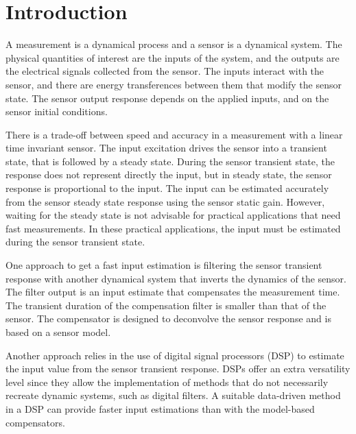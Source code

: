 \chapter{Introduction} \label{chap:Introduction}

\vfill{}

A measurement is a dynamical process and a sensor is a dynamical system.
The physical quantities of interest are the inputs of the system, and the outputs are the electrical signals collected from the sensor.
The inputs interact with the sensor, and there are energy transferences between them that modify the sensor state.
The sensor output response depends on the applied inputs, and on the sensor initial conditions.

There is a trade-off between speed and accuracy in a measurement with a linear time invariant sensor.
The input excitation drives the sensor into a transient state, that is followed by a steady state.
During the sensor transient state, the response does not represent directly the input, but 
in steady state, the sensor response is proportional to the input.
The input can be estimated accurately from the sensor steady state response using the sensor static gain.
However, waiting for the steady state is not advisable for practical applications that need fast measurements.
In these practical applications, the input must be estimated during the sensor transient state.

One approach to get a fast input estimation is filtering the sensor transient response with another dynamical system that inverts the dynamics of the sensor.
The filter output is an input estimate that compensates the measurement time.
The transient duration of the compensation filter is smaller than that of the sensor.
The compensator is designed to deconvolve the sensor response and is based on a sensor model.

Another approach relies in the use of digital signal processors (DSP) to estimate the input value from the sensor transient response.
DSPs offer an extra versatility level since they allow the implementation of methods that do not necessarily recreate dynamic systems, such as digital filters.
A suitable data-driven method in a DSP can provide faster input estimations than with the model-based compensators.

